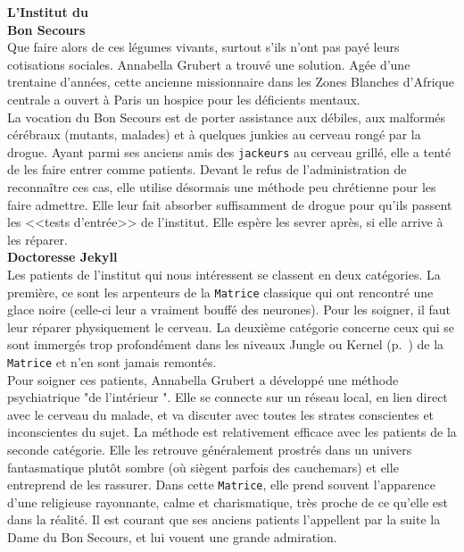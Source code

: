 \documentclass[11pt,twoside,a4paper]{article}
\begin{document}
\begin{multicols*}{3}
{	\vfill
	\columnbreak
	
	\textbf{\Large L'Institut du ~\\ Bon Secours}~\\
	
	Que faire alors de ces l{\'e}gumes vivants, surtout s'ils n'ont pas pay{\'e} leurs cotisations sociales. Annabella Grubert a trouv{\'e} une solution. Ag{\'e}e d'une trentaine d'ann{\'e}es, cette ancienne missionnaire dans les Zones Blanches d'Afrique centrale a ouvert {\`a} Paris un hospice pour les d{\'e}ficients mentaux.~\\
	
	La vocation du Bon Secours est de porter assistance aux d{\'e}biles, aux malform{\'e}s c{\'e}r{\'e}braux (mutants, malades) et {\`a} quelques junkies au cerveau rong{\'e} par la drogue. Ayant parmi ses anciens amis des \texttt{jackeurs} au cerveau grill{\'e}, elle a tent{\'e} de les faire entrer comme patients. Devant le refus de l'administration de reconna{\^i}tre ces cas, elle utilise d{\'e}sormais une m{\'e}thode peu chr{\'e}tienne pour les faire admettre. Elle leur fait absorber suffisamment de drogue pour qu'ils passent les <<tests d'entr{\'e}e>> de l'institut. Elle esp{\`e}re les sevrer apr{\`e}s, si elle arrive {\`a} les r{\'e}parer.~\\
	
	\textbf{\Large Doctoresse Jekyll}~\\
	
	Les patients de l'institut qui nous int{\'e}ressent se classent en deux cat{\'e}gories. La premi{\`e}re, ce sont les arpenteurs de la \texttt{Matrice} classique qui ont rencontr{\'e} une glace noire (celle-ci leur a vraiment bouff{\'e} des neurones). Pour les soigner, il faut leur r{\'e}parer physiquement le cerveau. La deuxi{\`e}me cat{\'e}gorie concerne ceux qui se sont immerg{\'e}s trop profond{\'e}ment dans les niveaux Jungle ou Kernel (p.~\pageref{JungleMatrice}) de la \texttt{Matrice} et n'en sont jamais remont{\'e}s.~\\
	
	Pour soigner ces patients, Annabella Grubert a d{\'e}velopp{\'e} une m{\'e}thode psychiatrique "de l'int{\'e}rieur ". Elle se connecte sur un r{\'e}seau local, en lien direct avec le cerveau du malade, et va discuter avec toutes les strates conscientes et inconscientes du sujet. La m{\'e}thode est relativement efficace avec les patients de la seconde cat{\'e}gorie. Elle les retrouve g{\'e}n{\'e}ralement prostr{\'e}s dans un univers fantasmatique plut{\^o}t sombre (o{\`u} si{\`e}gent parfois des cauchemars) et elle entreprend de les rassurer. Dans cette \texttt{Matrice}, elle prend souvent l'apparence d'une religieuse rayonnante, calme et charismatique, tr{\`e}s proche de ce qu'elle est dans la r{\'e}alit{\'e}. Il est courant que ses anciens patients l'appellent par la suite la Dame du Bon Secours, et lui vouent une grande admiration.~\\
	
}
\end{multicols*}
\end{document}
